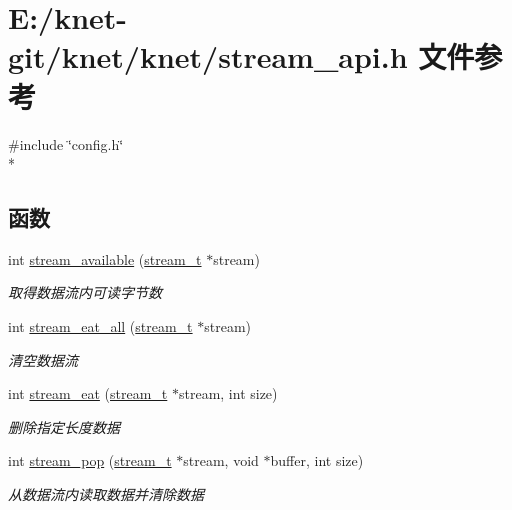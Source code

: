 \hypertarget{a00092}{}\section{E\+:/knet-\/git/knet/knet/stream\+\_\+api.h 文件参考}
\label{a00092}
{\ttfamily \#include \char`\"{}config.\+h\char`\"{}}\\*
\subsection*{函数}
\begin{DoxyCompactItemize}
\item 
int \hyperlink{a00106_ga6e109b2dc520782567dc1891af3b945e_ga6e109b2dc520782567dc1891af3b945e}{stream\+\_\+available} (\hyperlink{a00050_a261dba04f46f5c59a68a05f69f5a65a8_a261dba04f46f5c59a68a05f69f5a65a8}{stream\+\_\+t} $\ast$stream)
\begin{DoxyCompactList}\small\item\em 取得数据流内可读字节数 \end{DoxyCompactList}\item 
int \hyperlink{a00106_gaef7f4ca2c201faf5d82a1dad4c8d7814_gaef7f4ca2c201faf5d82a1dad4c8d7814}{stream\+\_\+eat\+\_\+all} (\hyperlink{a00050_a261dba04f46f5c59a68a05f69f5a65a8_a261dba04f46f5c59a68a05f69f5a65a8}{stream\+\_\+t} $\ast$stream)
\begin{DoxyCompactList}\small\item\em 清空数据流 \end{DoxyCompactList}\item 
int \hyperlink{a00106_ga1ab922f8bab979099b3abc3ee54dc59d_ga1ab922f8bab979099b3abc3ee54dc59d}{stream\+\_\+eat} (\hyperlink{a00050_a261dba04f46f5c59a68a05f69f5a65a8_a261dba04f46f5c59a68a05f69f5a65a8}{stream\+\_\+t} $\ast$stream, int size)
\begin{DoxyCompactList}\small\item\em 删除指定长度数据 \end{DoxyCompactList}\item 
int \hyperlink{a00106_ga6e01758abf49f8b08cd457f1cb48a954_ga6e01758abf49f8b08cd457f1cb48a954}{stream\+\_\+pop} (\hyperlink{a00050_a261dba04f46f5c59a68a05f69f5a65a8_a261dba04f46f5c59a68a05f69f5a65a8}{stream\+\_\+t} $\ast$stream, void $\ast$buffer, int size)
\begin{DoxyCompactList}\small\item\em 从数据流内读取数据并清除数据 \end{DoxyCompactList}\item 

\end{DoxyCompactItemize}
